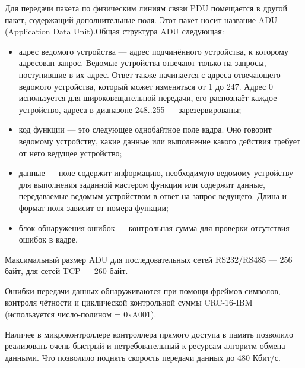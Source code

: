        Для передачи пакета по физическим линиям связи PDU помещается в другой
        пакет, содержащий дополнительные поля. Этот пакет носит название ADU
        (Application Data Unit).Общая структура ADU следующая:
        
        \begin{itemize}
            \item адрес ведомого устройства — адрес подчинённого устройства, к
                которому адресован запрос. Ведомые устройства отвечают только
                на запросы, поступившие в их адрес. Ответ также начинается с
                адреса отвечающего ведомого устройства, который может
                изменяться от 1 до 247. Адрес 0 используется для
                широковещательной передачи, его распознаёт каждое устройство,
                адреса в диапазоне 248..255 — зарезервированы; 
            \item код функции — это следующее однобайтное поле кадра. Оно
                говорит ведомому устройству, какие данные или выполнение какого
                действия требует от него ведущее устройство; 
            \item данные — поле содержит информацию, необходимую ведомому
                устройству для выполнения заданной мастером функции или
                содержит данные, передаваемые ведомым устройством в ответ на
                запрос ведущего.  Длина и формат поля зависит от номера
                функции;
            \item блок обнаружения ошибок — контрольная сумма для проверки
                отсутствия ошибок в кадре.
        \end{itemize}

        Максимальный размер ADU для последовательных сетей RS232/RS485 — 256
        байт, для сетей TCP — 260 байт. 

        Ошибки передачи данных обнаруживаются при помощи фреймов символов,
        контроля чётности и циклической контрольной суммы CRC-16-IBM
        (используется число-полином = 0xA001). 

        Наличее в микроконтроллере контроллера прямого доступа в память
        позволило реализовать очень быстрый и нетребовательный к ресурсам
        алгоритм обмена данными. Что позволило поднять скорость передачи данных
        до 480 Кбит/с.


